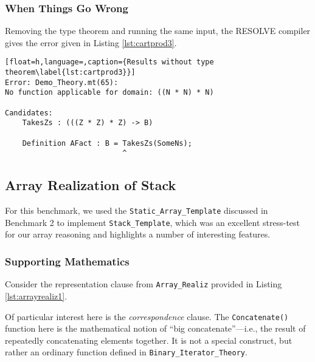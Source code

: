 		\subsubsection{When Things Go Wrong}	%

Removing the type theorem and running the same input, the RESOLVE compiler gives the error given in Listing \ref{lst:cartprod3}.

\begin{lstlisting}[float=h,language=,caption={Results without type theorem\label{lst:cartprod3}}]
Error: Demo_Theory.mt(65):
No function applicable for domain: ((N * N) * N)

Candidates:
	TakesZs : (((Z * Z) * Z) -> B)

	Definition AFact : B = TakesZs(SomeNs);
	                       ^
\end{lstlisting}

	\subsection{Array Realization of Stack}	%

For this benchmark, we used the \texttt{Static\_Array\_Template} discussed in Benchmark 2 to implement \texttt{Stack\_Template}, which was an excellent stress-test for our array reasoning and highlights a number of interesting features.

		\subsubsection{Supporting Mathematics}	%

Consider the representation clause from \texttt{Array\_Realiz} provided in Listing \ref{lst:arrayrealiz1}.



Of particular interest here is the \emph{correspondence} clause.  The \texttt{Concatenate()} function here is the mathematical notion of ``big concatenate''---i.e., the result of repeatedly concatenating elements together.  It is not a special construct, but rather an ordinary function defined in \texttt{Binary\_Iterator\_Theory}.

